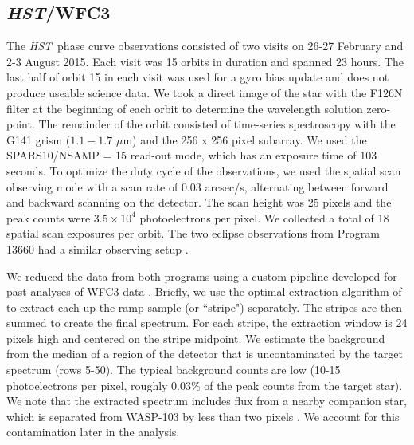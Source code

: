 \documentclass[twocolumn, trackchanges]{aastex61}
\newcommand{\project}[1]{\textsl{#1}}
\newcommand{\HST}{\project{HST}}
\begin{document}
\subsection{\HST/WFC3}
The \HST\ phase curve observations consisted of two visits on 26-27 February and 2-3 August 2015. Each visit was 15 orbits in duration and spanned 23 hours. The last half of orbit 15 in each visit was used for a gyro bias update and does not produce useable science data.  We took a direct image of the star with the F126N filter at the beginning of each orbit to determine the wavelength solution zero-point. The remainder of the orbit consisted of time-series spectroscopy with the G141 grism ($1.1 - 1.7$ $\mu$m) and the 256 x 256 pixel subarray. We used the SPARS10/NSAMP = 15 read-out mode, which has an exposure time of 103 seconds. To optimize the duty cycle of the observations, we used the spatial scan observing mode with a scan rate of 0.03 arcsec/s, alternating between forward and backward scanning on the detector. The scan height was 25 pixels and the peak counts were $3.5\times10^4$ photoelectrons per pixel. We collected a total of 18 spatial scan exposures per orbit.  The two eclipse observations from Program 13660 had a similar observing setup \citep[described in detail in][]{cartier17}.  

We reduced the data from both programs using a custom pipeline developed for past analyses of WFC3 data \citep[for details see][]{kreidberg14a, kreidberg14b, kreidberg15b}. Briefly, we use the optimal extraction algorithm of \cite{horne86} to extract each up-the-ramp sample (or ``stripe") separately. The stripes are then summed to create the final spectrum. For each stripe, the extraction window is 24 pixels high and centered on the stripe midpoint. We estimate the background from the median of a region of the detector that is uncontaminated by the target spectrum (rows 5-50). The typical background counts are low (10-15 photoelectrons per pixel, roughly 0.03\% of the peak counts from the target star). We note that the extracted spectrum includes flux from a nearby companion star, which is separated from WASP-103 by less than two pixels \citep[0.2";][]{wollert15}. We account for this contamination later in the analysis. 
\end{document}
